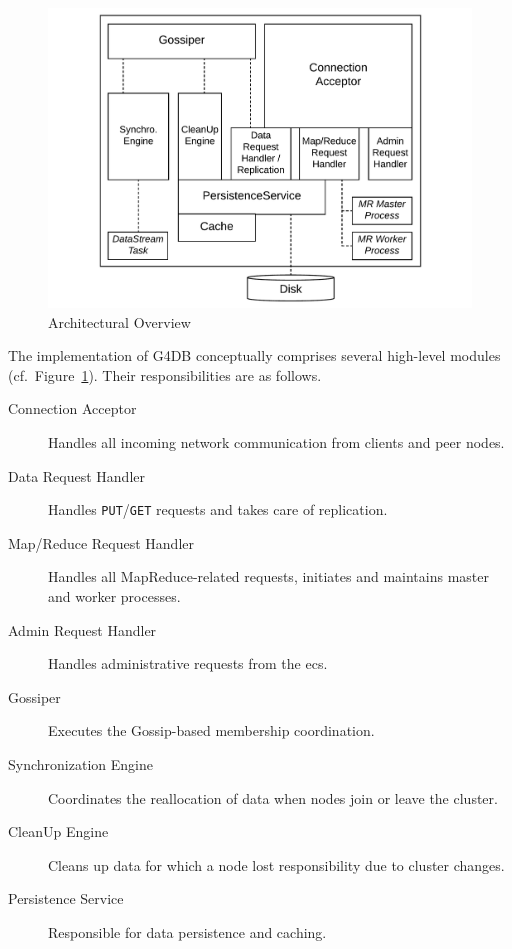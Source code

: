 \begin{figure}[]
	\includegraphics[width=\linewidth]{resources/architecture}
	\caption{Architectural Overview}
	\label{fig:arch}
\end{figure}

The implementation of G4DB conceptually comprises several high-level modules (cf.~Figure~\ref{fig:arch}).
Their responsibilities are as follows.

\begin{description}
\item[Connection Acceptor] Handles all incoming network communication from clients and peer nodes.
\item[Data Request Handler] Handles \texttt{PUT}/\texttt{GET} requests and takes care of replication.
\item[Map/Reduce Request Handler] Handles all MapReduce-related requests, initiates and maintains master and worker processes.
\item[Admin Request Handler] Handles administrative requests from the \ac{ecs}.
\item[Gossiper] Executes the Gossip-based membership coordination.
\item[Synchronization Engine] Coordinates the reallocation of data when nodes join or leave the cluster.
\item[CleanUp Engine] Cleans up data for which a node lost responsibility due to cluster changes.
\item[Persistence Service] Responsible for data persistence and caching.
\end{description}


